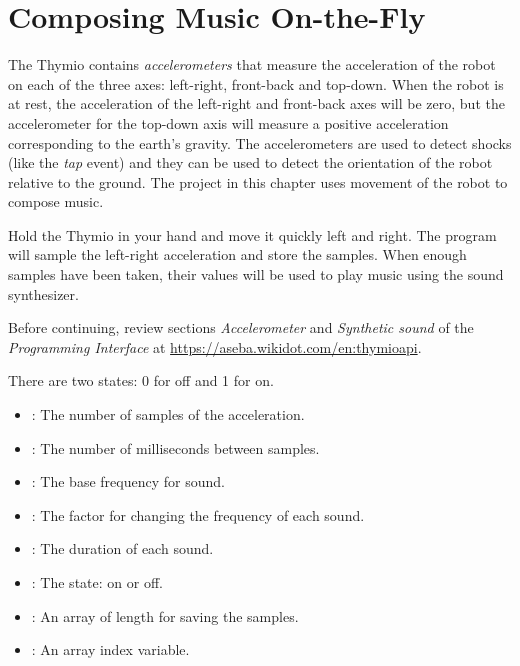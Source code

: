 
\chapter{Composing Music On-the-Fly}

The Thymio contains \emph{accelerometers} that measure
the acceleration of the robot on each of the three axes: left-right,
front-back and top-down. When the robot is at rest, the acceleration of
the left-right and front-back axes will be zero, but the accelerometer
for the top-down axis will measure a positive acceleration corresponding
to the earth's gravity.
The accelerometers are used to detect shocks (like the \emph{tap} event)
and they can be used to detect the orientation of the robot relative
to the ground. The project in this chapter uses movement of the robot
to compose music.


Hold the Thymio in your hand and move it quickly left and right.
The program will sample the left-right acceleration and store the samples.
When enough samples have been taken, their values will be used to play
music using the sound synthesizer.


Before continuing, review sections \emph{Accelerometer}
and \emph{Synthetic sound} of the \emph{Programming Interface}
at \url{https://aseba.wikidot.com/en:thymioapi}.



There are two states: 0 for off and 1 for on.


\begin{itemize}
\item {}: The number of samples of the acceleration.
\item {}: The number of milliseconds between samples.
\item {}: The base frequency for sound.
\item {}: The factor for changing the frequency of each sound.
\item {}: The duration of each sound.
\end{itemize}


\begin{itemize}
\item {}: The state: on or off. 
\item {}: An array of length  for saving the samples.
\item {}: An array index variable.
\end{itemize}

